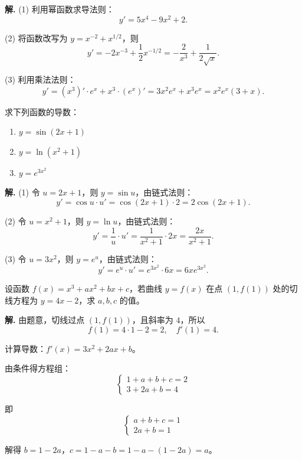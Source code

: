 \documentclass[11pt]{ctexrep}
\begin{document}
\textbf{解.} (1) 利用幂函数求导法则：
\[
    y' = 5x^4 - 9x^2 + 2.
\]

(2) 将函数改写为 $y = x^{-2} + x^{1/2}$，则
\[
    y' = -2x^{-3} + \frac{1}{2}x^{-1/2} = -\frac{2}{x^3} + \frac{1}{2\sqrt{x}}.
\]

(3) 利用乘法法则：
\[
    y' = (x^3)' \cdot e^x + x^3 \cdot (e^x)' = 3x^2 e^x + x^3 e^x = x^2 e^x (3 + x).
\]

\begin{example}[复合函数求导]
    求下列函数的导数：
    \begin{enumerate}
        \item $y = \sin(2x + 1)$
        \item $y = \ln(x^2 + 1)$
        \item $y = e^{3x^2}$
    \end{enumerate}
\end{example}

\textbf{解.} (1) 令 $u = 2x + 1$，则 $y = \sin u$，由链式法则：
\[
    y' = \cos u \cdot u' = \cos(2x + 1) \cdot 2 = 2\cos(2x + 1).
\]

(2) 令 $u = x^2 + 1$，则 $y = \ln u$，由链式法则：
\[
    y' = \frac{1}{u} \cdot u' = \frac{1}{x^2 + 1} \cdot 2x = \frac{2x}{x^2 + 1}.
\]

(3) 令 $u = 3x^2$，则 $y = e^u$，由链式法则：
\[
    y' = e^u \cdot u' = e^{3x^2} \cdot 6x = 6x e^{3x^2}.
\]

\begin{realexam}[2024 上海春考]
    设函数 $f(x) = x^3 + ax^2 + bx + c$，若曲线 $y = f(x)$ 在点 $(1, f(1))$ 处的切线方程为 $y = 4x - 2$，求 $a, b, c$ 的值。
\end{realexam}

\textbf{解.} 由题意，切线过点 $(1, f(1))$，且斜率为 $4$，所以
\[
    f(1) = 4 \cdot 1 - 2 = 2, \quad f'(1) = 4.
\]

计算导数：$f'(x) = 3x^2 + 2ax + b$。

由条件得方程组：
\[
    \begin{cases}
        1 + a + b + c = 2 \\[4pt]
        3 + 2a + b = 4
    \end{cases}
\]

即
\[
    \begin{cases}
        a + b + c = 1 \\[4pt]
        2a + b = 1
    \end{cases}
\]

解得 $b = 1 - 2a$，$c = 1 - a - b = 1 - a - (1 - 2a) = a$。
\end{document}
